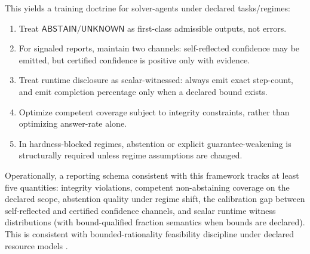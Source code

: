This yields a training doctrine for solver-agents under declared tasks/regimes:
\begin{enumerate}
\item Treat $\mathsf{ABSTAIN}/\mathsf{UNKNOWN}$ as first-class admissible outputs, not errors.
\item For signaled reports, maintain two channels: self-reflected confidence may be emitted, but certified confidence is positive only with evidence.
\item Treat runtime disclosure as scalar-witnessed: always emit exact step-count, and emit completion percentage only when a declared bound exists.
\item Optimize competent coverage subject to integrity constraints, rather than optimizing answer-rate alone.
\item In hardness-blocked regimes, abstention or explicit guarantee-weakening is structurally required unless regime assumptions are changed.
\end{enumerate}

Operationally, a reporting schema consistent with this framework tracks at least five quantities: integrity violations, competent non-abstaining coverage on the declared scope, abstention quality under regime shift, the calibration gap between self-reflected and certified confidence channels, and scalar runtime witness distributions (with bound-qualified fraction semantics when bounds are declared). This is consistent with bounded-rationality feasibility discipline under declared resource models \cite{sep_bounded_rationality,arora2009computational}.


\appendix
